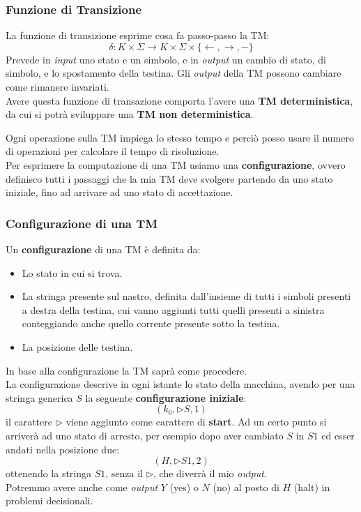 \subsubsection{Funzione di Transizione}
\begin{definizione}
  La funzione di transizione esprime cosa fa passo-passo la TM:
  \[\delta:K\times\Sigma\to K\times \Sigma\times\{\leftarrow,\rightarrow,-\}\]
  Prevede in \textit{input} uno stato e un simbolo, e in \textit{output} un cambio
  di stato, di simbolo, e lo spostamento della testina. 
  Gli \textit{output} della TM possono cambiare come rimanere invariati.\\
  Avere questa funzione di transazione comporta l'avere una
  \textbf{TM deterministica}, da cui si potrà sviluppare una \textbf{TM non
    deterministica}.
\end{definizione}
Ogni operazione sulla TM impiega lo stesso tempo e perciò posso usare il numero di
operazioni per calcolare il tempo di risoluzione.\\
Per esprimere la computazione di una TM usiamo una \textbf{configurazione},
ovvero definisco tutti i passaggi che la mia TM deve svolgere partendo da uno stato iniziale, 
fino ad arrivare ad uno stato di accettazione.

\subsubsection{Configurazione di una TM}
\begin{definizione}
  Un \textbf{configurazione} di una TM è definita da:
  \begin{itemize}
    \item Lo stato in cui si trova.
    \item La stringa presente sul nastro, definita dall'insieme di tutti i simboli presenti a destra della testina, cui vanno aggiunti tutti quelli presenti a sinistra conteggiando anche quello corrente presente sotto la testina. 
    \item La posizione delle testina. 
  \end{itemize}
  In base alla configurazione la TM saprà come procedere.\\
  La configurazione descrive in ogni istante lo stato della macchina, avendo per una stringa generica $S$ la seguente \textbf{configurazione iniziale}:
  \[(k_0,\triangleright S, 1)\]
  il carattere $\triangleright$ viene aggiunto come carattere di \textbf{start}.
  Ad un certo punto si arriverà ad uno stato di arresto, per esempio dopo
  aver cambiato $S$ in $S1$ ed esser andati nella posizione due:
  \[(H,\triangleright S1, 2)\]
  ottenendo la stringa $S1$, senza il $\triangleright$, che diverrà il mio \textit{output}.\\
   Potremmo avere anche come \textit{output} $Y$ (yes) o $N$ (no) al posto di $H$ (halt) in problemi decisionali.
\end{definizione}
